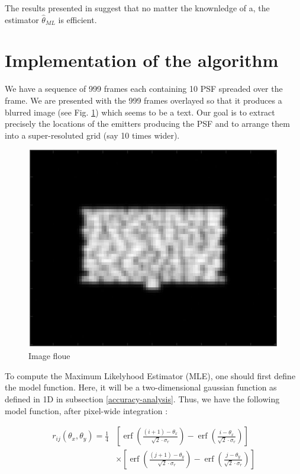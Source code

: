 \documentclass[10pt,letterpaper]{article}
\begin{document}
The results presented in \cite{project} suggest that no matter the knownledge of a, the estimator $\hat{\theta}_{ML}$ is efficient.

\pagebreak

\section{Implementation of the algorithm}

We have a sequence of 999 frames each containing 10 PSF spreaded over the frame. We are presented with the 999 frames overlayed so that it produces a blurred image (see Fig. \ref{fig:floue}) which seems to be a text. Our goal is to extract precisely the locations of the emitters producing the PSF and to arrange them into a super-resoluted grid (say 10 times wider).

\begin{figure}[h]
	\centering
	\includegraphics[scale=0.65]{ImageFloue.JPG}
	\caption{Image floue}
	\label{fig:floue}
\end{figure}

To compute the Maximum Likelyhood Estimator (MLE), one should first define the model function. Here, it will be a two-dimensional gaussian function as defined in 1D in subsection \ref{accuracy-analysis}. Thus, we have the following model function, after pixel-wide integration :

\begin{equation}
\begin{aligned}
r_{i j}\left(\theta_x, \theta_y\right)=\frac{1}{4}&\left[\operatorname{erf}\left(\frac{(i+1)-\theta_x}{\sqrt{2} \cdot \sigma_r}\right)-\operatorname{erf}\left(\frac{i-\theta_x}{\sqrt{2} \cdot \sigma_r}\right)\right] \\
& \times\left[\operatorname{erf}\left(\frac{(j+1)-\theta_y}{\sqrt{2} \cdot \sigma_r}\right)-\operatorname{erf}\left(\frac{j-\theta_y}{\sqrt{2} \cdot \sigma_r}\right)\right]
\end{aligned}
\end{equation}
\end{document}

